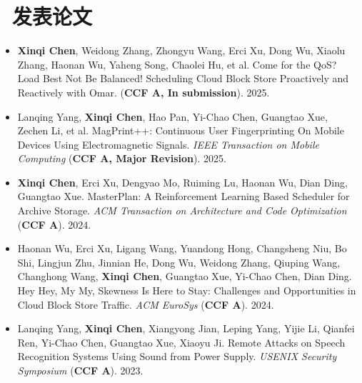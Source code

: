 \documentclass{resume}
\begin{document}
\section{\faFileTextO \ 发表论文}
\begin{itemize}[parsep=0.5ex]
  \item \textbf{Xinqi Chen}, Weidong Zhang, Zhongyu Wang, Erci Xu, Dong Wu, Xiaolu Zhang, Haonan Wu, Yaheng Song, Chaolei Hu, et al. Come for the QoS? Load Best Not Be Balanced! Scheduling Cloud Block Store Proactively and Reactively with
  Omar. (\textbf{CCF A, In submission}). 2025.
  \item Lanqing Yang, \textbf{Xinqi Chen}, Hao Pan, Yi-Chao Chen, Guangtao Xue, Zechen Li, et al. MagPrint++: Continuous User Fingerprinting On
  Mobile Devices Using Electromagnetic Signals. \textit{IEEE Transaction on Mobile Computing} (\textbf{CCF A, Major Revision}). 2025.
  \item \textbf{Xinqi Chen}, Erci Xu, Dengyao Mo, Ruiming Lu, Haonan Wu, Dian Ding, Guangtao Xue. MasterPlan: A Reinforcement Learning Based Scheduler for Archive Storage. \textit{ACM Transaction on Architecture and Code Optimization} (\textbf{CCF A}). 2024.
  \item Haonan Wu, Erci Xu, Ligang Wang, Yuandong Hong, Changsheng Niu, Bo Shi, Lingjun Zhu, Jinnian He, Dong Wu, Weidong Zhang, Qiuping Wang, Changhong Wang, \textbf{Xinqi Chen}, Guangtao Xue, Yi-Chao Chen, Dian Ding. Hey Hey, My My, Skewness Is Here to Stay: Challenges and Opportunities in Cloud Block Store Traffic. \textit{ACM EuroSys} (\textbf{CCF A}). 2024.
  \item Lanqing Yang, \textbf{Xinqi Chen}, Xiangyong Jian, Leping Yang, Yijie Li, Qianfei Ren, Yi-Chao Chen, Guangtao Xue, Xiaoyu Ji. Remote Attacks on Speech Recognition Systems Using Sound from Power Supply. \textit{USENIX Security Symposium} (\textbf{CCF A}). 2023.
\end{itemize}



\end{document}
